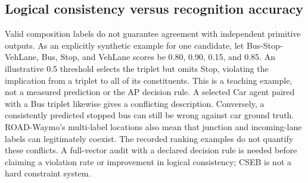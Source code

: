 \documentclass[11pt,letterpaper]{article}
\begin{document}
\subsection{Logical consistency versus recognition accuracy}
Valid composition labels do not guarantee agreement with independent primitive outputs. As an explicitly synthetic example for one candidate, let Bus-Stop-VehLane, Bus, Stop, and VehLane scores be 0.80, 0.90, 0.15, and 0.85. An illustrative 0.5 threshold selects the triplet but omits Stop, violating the implication from a triplet to all of its constituents. This is a teaching example, not a measured prediction or the AP decision rule. A selected Car agent paired with a Bus triplet likewise gives a conflicting description. Conversely, a consistently predicted stopped bus can still be wrong against car ground truth. ROAD-Waymo's multi-label locations also mean that junction and incoming-lane labels can legitimately coexist. The recorded ranking examples do not quantify these conflicts. A full-vector audit with a declared decision rule is needed before claiming a violation rate or improvement in logical consistency; CSEB is not a hard constraint system.
\end{document}

